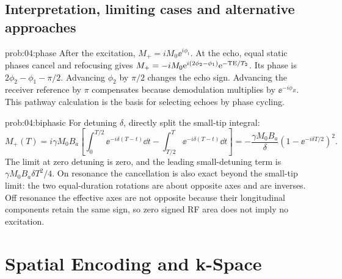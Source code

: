 \subsection{Interpretation, limiting cases and alternative approaches}
\begin{solution}{prob:04:phase}
After the excitation, \(M_+=iM_0\ee^{i\phi_1}\).
At the echo, equal static phases cancel and refocusing gives
\(M_+=-iM_0\mathrm{e}^{i(2\phi_2-\phi_1)}\mathrm{e}^{-\mathrm{TE}/T_2}\).
Its phase is \(2\phi_2-\phi_1-\pi/2\).
Advancing \(\phi_2\) by \(\pi/2\) changes the echo sign. Advancing the receiver reference by \(\pi\) compensates because demodulation multiplies by \(\ee^{-i\phi_R}\). This pathway calculation is the basis for selecting echoes by phase cycling.
\end{solution}
\begin{solution}{prob:04:biphasic}
For detuning \(\delta\), directly split the small-tip integral:
\[
 M_+(T)=i\gamma M_0B_a
 \left[\int_0^{T/2}\ee^{-i\delta(T-t)}\dd t
 -\int_{T/2}^T\ee^{-i\delta(T-t)}\dd t\right]
 =-\frac{\gamma M_0B_a}{\delta}
       (1-\ee^{-i\delta T/2})^2 .
\]
The limit at zero detuning is zero, and the leading small-detuning term is
\(\gamma M_0B_a\delta T^2/4\).
On resonance the cancellation is also exact beyond the small-tip limit: the two equal-duration rotations are about opposite axes and are inverses. Off resonance the effective axes are not opposite because their longitudinal components retain the same sign, so zero signed RF area does not imply no excitation.
\end{solution}

\section{Spatial Encoding and k-Space}
\label{sec:e:spatial-encoding-and-k-space}
